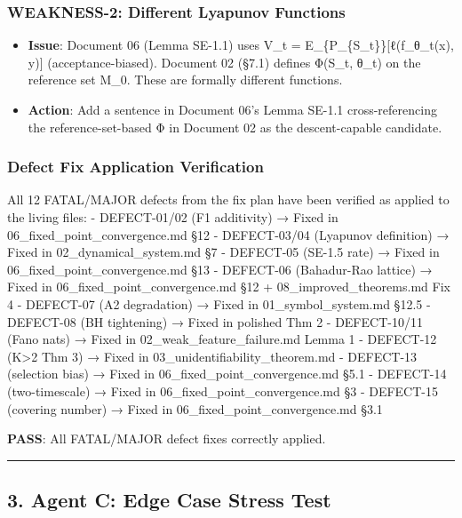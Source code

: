 \documentclass[
  12pt,
]{ctexart}
\providecommand{\tightlist}{%
  \setlength{\itemsep}{0pt}\setlength{\parskip}{0pt}}
\begin{document}
\subsubsection{WEAKNESS-2: Different Lyapunov
Functions}\label{weakness-2-different-lyapunov-functions}

\begin{itemize}
\tightlist
\item
  \textbf{Issue}: Document 06 (Lemma SE-1.1) uses V\_t =
  E\_\{P\_\{S\_t\}\}{[}ℓ(f\_θ\_t(x), y){]} (acceptance-biased). Document
  02 (§7.1) defines Φ(S\_t, θ\_t) on the reference set M\_0. These are
  formally different functions.
\item
  \textbf{Action}: Add a sentence in Document 06's Lemma SE-1.1
  cross-referencing the reference-set-based Φ in Document 02 as the
  descent-capable candidate.
\end{itemize}

\subsubsection{Defect Fix Application
Verification}\label{defect-fix-application-verification}

All 12 FATAL/MAJOR defects from the fix plan have been verified as
applied to the living files: - DEFECT-01/02 (F1 additivity) → Fixed in
06\_fixed\_point\_convergence.md §12 - DEFECT-03/04 (Lyapunov
definition) → Fixed in 02\_dynamical\_system.md §7 - DEFECT-05 (SE-1.5
rate) → Fixed in 06\_fixed\_point\_convergence.md §13 - DEFECT-06
(Bahadur-Rao lattice) → Fixed in 06\_fixed\_point\_convergence.md §12 +
08\_improved\_theorems.md Fix 4 - DEFECT-07 (A2 degradation) → Fixed in
01\_symbol\_system.md §12.5 - DEFECT-08 (BH tightening) → Fixed in
polished Thm 2 - DEFECT-10/11 (Fano nats) → Fixed in
02\_weak\_feature\_failure.md Lemma 1 - DEFECT-12 (K\textgreater2 Thm 3)
→ Fixed in 03\_unidentifiability\_theorem.md - DEFECT-13 (selection
bias) → Fixed in 06\_fixed\_point\_convergence.md §5.1 - DEFECT-14
(two-timescale) → Fixed in 06\_fixed\_point\_convergence.md §3 -
DEFECT-15 (covering number) → Fixed in 06\_fixed\_point\_convergence.md
§3.1

\textbf{PASS}: All FATAL/MAJOR defect fixes correctly applied.

\begin{center}\rule{0.5\linewidth}{0.5pt}\end{center}

\subsection{3. Agent C: Edge Case Stress
Test}\label{agent-c-edge-case-stress-test}
\end{document}
